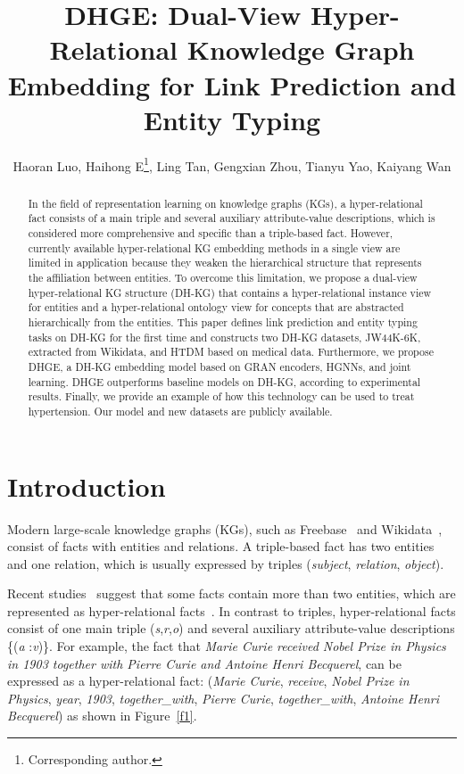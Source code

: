 \documentclass[letterpaper]{article} \usepackage{aaai23}  \usepackage{times}  \usepackage{helvet}  \usepackage{courier}  \usepackage[hyphens]{url}  \usepackage{graphicx} \urlstyle{rm} \def\UrlFont{\rm}  \usepackage{natbib}  \usepackage{caption} \frenchspacing  \setlength{\pdfpagewidth}{8.5in}  \setlength{\pdfpageheight}{11in}  \usepackage{times}
\title{DHGE: Dual-View Hyper-Relational Knowledge Graph Embedding for Link Prediction and Entity Typing}
\author{
Haoran Luo,
    Haihong E\thanks{Corresponding author.},
    Ling Tan,
    Gengxian Zhou,
    Tianyu Yao,
    Kaiyang Wan
}
\begin{document}
\maketitle

\begin{abstract}
In the field of representation learning on knowledge graphs (KGs), a hyper-relational fact consists of a main triple and several auxiliary attribute-value descriptions, which is considered more comprehensive and specific than a triple-based fact. However, currently available hyper-relational KG embedding methods in a single view are limited in application because they weaken the hierarchical structure that represents the affiliation between entities. To overcome this limitation, we propose a dual-view hyper-relational KG structure (DH-KG) that contains a hyper-relational instance view for entities and a hyper-relational ontology view for concepts that are abstracted hierarchically from the entities. This paper defines link prediction and entity typing tasks on DH-KG for the first time and constructs two DH-KG datasets, JW44K-6K, extracted from Wikidata, and HTDM based on medical data. Furthermore, we propose DHGE, a DH-KG embedding model based on GRAN encoders, HGNNs, and joint learning. DHGE outperforms baseline models on DH-KG, according to experimental results. Finally, we provide an example of how this technology can be used to treat hypertension. Our model and new datasets are publicly available.
\end{abstract}

\section{Introduction}
\label{s1}

Modern large-scale knowledge graphs (KGs), such as Freebase~\cite{Freebase} and Wikidata~\cite{Wikidata}, consist of facts with entities and relations. A triple-based fact has two entities and one relation, which is usually expressed by triples (\textit{subject}, \textit{relation}, \textit{object}). 


Recent studies~\citep{m-TransH, NaLP} suggest that some facts contain more than two entities, which are represented as hyper-relational facts~\citep{HINGE}. In contrast to triples, hyper-relational facts consist of one main triple (\textit{s},\textit{r},\textit{o}) and several auxiliary attribute-value descriptions \{(\textit{a }:\textit{v})\}. For example, the fact that \textit{Marie Curie received Nobel Prize in Physics in 1903 together with Pierre Curie and Antoine Henri Becquerel}, can be expressed as a hyper-relational fact: (\textit{Marie Curie}, \textit{receive}, \textit{Nobel Prize in Physics}, \textit{year}, \textit{1903}, \textit{together\_with}, \textit{Pierre Curie}, \textit{together\_with}, \textit{Antoine Henri Becquerel}) as shown in Figure~\ref{f1}.
\end{document}
